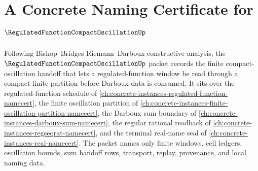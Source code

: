 \chapter{A Concrete Naming Certificate for $\RegulatedFunctionCompactOscillationUp$}
\label{ch:concrete-instances-regulated-function-compact-oscillation-namecert}

Following Bishop--Bridges Riemann--Darboux constructive analysis, the $\RegulatedFunctionCompactOscillationUp$ packet records the finite compact-oscillation handoff that lets a regulated-function window be read through a compact finite partition before Darboux data is consumed. It sits over the regulated-function schedule of \autoref{ch:concrete-instances-regulated-function-namecert}, the finite oscillation partition of \autoref{ch:concrete-instances-finite-oscillation-partition-namecert}, the Darboux sum boundary of \autoref{ch:concrete-instances-darboux-sum-namecert}, the regular rational readback of \autoref{ch:concrete-instances-regseqrat-namecert}, and the terminal real-name seal of \autoref{ch:concrete-instances-real-namecert}. The packet names only finite windows, cell ledgers, oscillation bounds, sum handoff rows, transport, replay, provenance, and local naming data.

